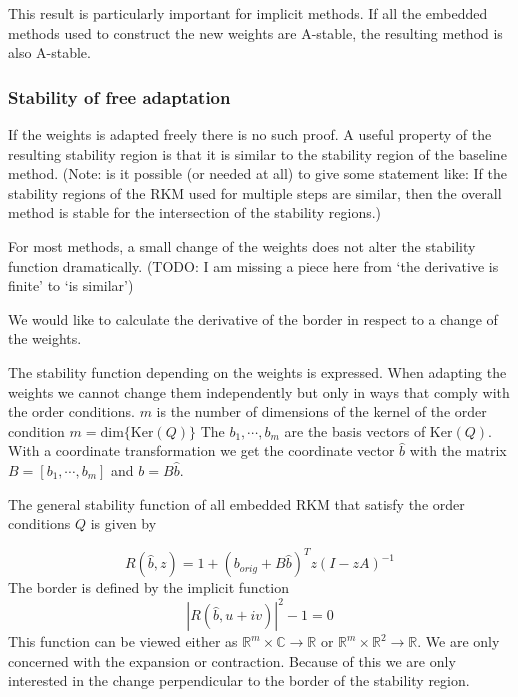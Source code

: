 \documentclass[a4paper]{article}
\numberwithin{equation}{section}
\theoremstyle{plain}
\theoremstyle{definition}
\numberwithin{theorem}{section}
\newcommand{\R}{\mathbb{R}}
\newcommand{\CN}{\mathbb{C}}
\newcommand{\1}{\mathbbm{1}}
\begin{document}
This result is particularly important for implicit methods.
If all the embedded methods used to construct the new weights
are A-stable, the resulting method is also A-stable.


\subsubsection{Stability of free adaptation}
If the weights is adapted freely there is no such proof.
A useful property of the resulting stability region is that it is similar to the stability region of the baseline method. 
(Note: is it possible (or needed at all) to give some statement like: If the stability regions of the RKM used for multiple steps are similar, then the overall method is stable for the intersection of the stability regions.)

For most methods, a small change of the weights does not alter the stability function dramatically.
(TODO: I am missing a piece here from ‘the derivative is finite’ to ‘is similar’)

We would like to calculate the derivative of the border in respect to a change of the weights. 

The stability function depending on the weights is expressed. 
When adapting the weights we cannot change them independently but only in ways that comply with the order conditions.
$m$ is the number of dimensions of the kernel of the order condition $m = \mathrm{dim}\{\mathrm{Ker} (Q) \}$
The $b_1,\cdots,b_m$  are the basis vectors of $\mathrm{Ker} (Q)$. With a coordinate transformation we get the coordinate vector $\hat{b}$ with the matrix $B = [b_1,\cdots,b_m]$ and $b = B \hat{b}$.

The general stability function of all embedded RKM that satisfy the order conditions $Q$ is given by

\begin{equation}\label{eq:gen_stabilityf}
R(\hat{b},z) = 1 +  (b_{orig} +B \hat{b})^T z(I - zA)^{-1}
\end{equation}
The border is defined by the implicit function 
\begin{equation}\label{eq:border}
|R(\hat{b},u+iv)|^2 -1 = 0
\end{equation}
This function can be viewed either as $\R^m \times  \CN \rightarrow \R$ or $\R^m \times  \R^2 \rightarrow \R$.
We are only concerned with the expansion or contraction. Because of this we are only interested in the change perpendicular to the border of the stability region. 
\end{document}
